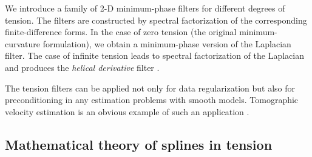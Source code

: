 We introduce a family of 2-D
minimum-phase filters for different degrees of tension.  The filters
are constructed by spectral factorization of the corresponding
finite-difference forms. In the case of zero tension (the original
minimum-curvature formulation), we obtain a minimum-phase version of
the Laplacian filter. The case of infinite tension leads to spectral
factorization of the Laplacian and produces the \emph{helical
  derivative} filter \cite[]{iee}.
\par
The tension filters can be applied not only for data regularization
but also for preconditioning in any estimation problems with smooth
models. Tomographic velocity estimation is an obvious example of such
an application \cite[]{SEG-1998-1218}.

\subsection{Mathematical theory of splines in tension}

